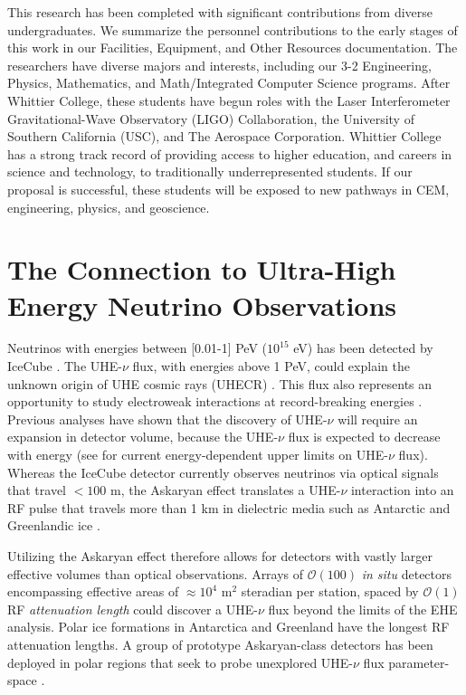 \documentclass[11pt]{amsart}
\begin{document}
This research has been completed with significant contributions from diverse undergraduates.  We summarize the personnel contributions to the early stages of this work in our Facilities, Equipment, and Other Resources documentation.  The researchers have diverse majors and interests, including our 3-2 Engineering, Physics, Mathematics, and Math/Integrated Computer Science programs.   After Whittier College, these students have begun roles with the Laser Interferometer Gravitational-Wave Observatory (LIGO) Collaboration, the University of Southern California (USC), and The Aerospace Corporation.  Whittier College has a strong track record of providing access to higher education, and careers in science and technology, to traditionally underrepresented students.  If our proposal is successful, these students will be exposed to new pathways in CEM, engineering, physics, and geoscience.

\section{The Connection to Ultra-High Energy Neutrino Observations}
\label{sec:askaryan}

Neutrinos with energies between [0.01-1] PeV ($10^{15}$ eV) has been detected by IceCube \cite{10.1126/science.1242856,10.1126/science.aat2890,10.1126/science.abg3395,10.1126/science.adc9818}.  The UHE-$\nu$ flux, with energies above 1 PeV, could explain the unknown origin of UHE cosmic rays (UHECR) \cite{Ackermann:201946d}.  This flux also represents an opportunity to study electroweak interactions at record-breaking energies \cite{Ackermann:20195ec}.  Previous analyses have shown that the discovery of UHE-$\nu$ will require an expansion in detector volume, because the UHE-$\nu$ flux is expected to decrease with energy (see \cite{10.1103/physrevd.99.122001,10.1088/1475-7516/2020/03/053,10.1103/physrevd.98.062003} for current energy-dependent upper limits on UHE-$\nu$ flux).  Whereas the IceCube detector currently observes neutrinos via optical signals that travel $<100$ m, the Askaryan effect translates a UHE-$\nu$ interaction into an RF pulse that travels more than 1 km in dielectric media such as Antarctic and Greenlandic ice \cite{askaryan1,zhs,10.3189/2015jog14j214, 10.3189/2015jog15j057, 10.1016/j.astropartphys.2011.11.010}. 

Utilizing the Askaryan effect therefore allows for detectors with vastly larger effective volumes than optical observations.  Arrays of $\mathcal{O}(100)$ \textit{in situ} detectors encompassing effective areas of $\approx 10^4$ m$^2$ steradian per station, spaced by $\mathcal{O}(1)$ RF \textit{attenuation length} could discover a UHE-$\nu$ flux beyond the limits of the EHE analysis.  Polar ice formations in Antarctica and Greenland have the longest RF attenuation lengths.  A group of prototype Askaryan-class detectors has been deployed in polar regions that seek to probe unexplored UHE-$\nu$ flux parameter-space \cite{rice,10.1088/1475-7516/2020/03/053,10.1103/physrevd.102.043021,10.1103/physrevd.99.122001}. 
\end{document}
